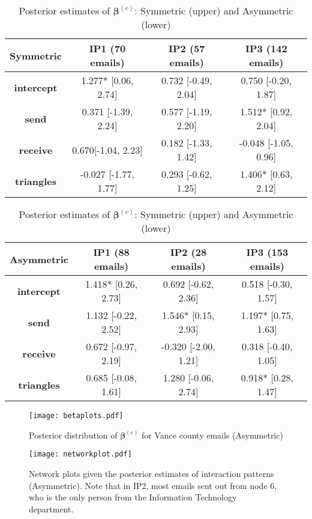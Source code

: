 \documentclass[a4paper]{article}
\begin{document}
\begin{table}[ht]
	\centering
		\begin{tabular}{|c|c|c|c|} 
			\hline
			\textbf{Symmetric}& \textbf{IP1} (70 emails) & \textbf{IP2} (57 emails) &\textbf{IP3} (142 emails) \\
			\hline
			\textbf{intercept} & 1.277* [0.06, 2.74]& 0.732 [-0.49, 2.04]& 0.750 [-0.20, 1.87] \\
			\textbf{send}&   0.371 [-1.39, 2.24]& 0.577 [-1.19, 2.20]&1.512* [0.92, 2.04]\\
			\textbf{receive}& 0.670[-1.04, 2.23]& 0.182 [-1.33, 1.42]& -0.048 [-1.05, 0.96]\\
			\textbf{triangles} & -0.027 [-1.77, 1.77]&  0.293 [-0.62, 1.25]& 1.406* [0.63, 2.12]\\
			\hline
		\end{tabular}
	\begin{tabular}{|c|c|c|c|} 
		\hline
		\textbf{Asymmetric}& \textbf{IP1} (88 emails) & \textbf{IP2} (28 emails) &\textbf{IP3} (153 emails) \\
		\hline
		\textbf{intercept} & 1.418* [0.26, 2.73]& 0.692 [-0.62, 2.36]& 0.518 [-0.30, 1.57]\\
		\textbf{send}&  1.132 [-0.22, 2.52]& 1.546* [0.15, 2.93]& 1.197* [0.75, 1.63]\\
		\textbf{receive}& 0.672 [-0.97, 2.19]& -0.320 [-2.00, 1.21]& 0.318 [-0.40, 1.05]\\
		\textbf{triangles} & 0.685 [-0.08, 1.61]&  1.280 [-0.06, 2.74]& 0.918* [0.28, 1.47]\\
		\hline
	\end{tabular}
	\caption {Posterior estimates of $\boldsymbol{\beta}^{(c)}$: Symmetric (upper) and Asymmetric (lower)}
	\label{table:Vancebeta}
\end{table}
\normalsize 	
\begin{figure}[ht]
	\centering
	\texttt{[image: betaplots.pdf]} 
	\caption{Posterior distribution of $\boldsymbol{\beta}^{(c)}$ for Vance county emails (Asymmetric)}
	\label{fig:Vanceboxplot}
\end{figure}
\begin{figure}[ht]
	\centering
	\texttt{[image: networkplot.pdf]} 
	\caption{Network plots given the posterior estimates of interaction patterns (Asymmetric). Note that in IP2, most emails sent out from node 6, who is the only person from the Information Technology department.}
	\label{fig:Vanceboxplot}
\end{figure}
\clearpage
\normalsize
\end{document}
